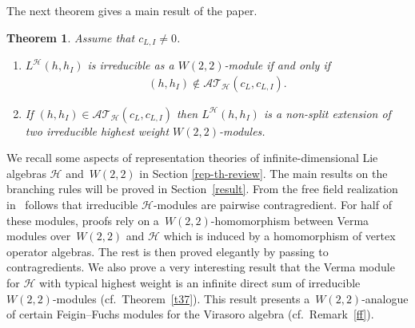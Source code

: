 \documentclass[pdftex]{sigma}
\numberwithin{equation}{section}
\newtheorem{Theorem}{Theorem}[section]
\newcommand{\HVir}{\mathcal H}
\begin{document}
The next theorem gives a main result of the paper.

\begin{Theorem}\label{main}
Assume that $c_{L,I}\neq0$.
\begin{enumerate}\itemsep=0pt
\item[$(1)$] $L^{\HVir}(h,h_I) $ is irreducible as a $W(2,2)$-module if and only if
\begin{gather*}
(h,h_I) \notin {\mathcal {AT} }_{\HVir} ( c_L, c_{L,I} ) .
\end{gather*}
\item[$(2)$] If $(h,h_I) \in {\mathcal {AT} }_{\HVir} ( c_L, c_{L,I} ) $ then $L^{\HVir}(h,h_I) $ is a non-split extension of two irreducible highest weight $W(2,2)$-modules.
\end{enumerate}
\end{Theorem}

We recall some aspects of representation theories of inf\/inite-dimensional Lie algebras $\HVir$ and~$W(2,2)$ in Section \ref{rep-th-review}. The main results on the branching rules will be proved in Section~\ref{result}. From the free f\/ield realization in~\cite{nas} follows that irreducible $\HVir$-modules are pairwise contragredient. For half of these modules, proofs rely on a~$W(2,2)$-homomorphism between Verma modules over~$W(2,2)$ and $\HVir$ which is induced by a homomorphism of vertex operator algebras. The rest is then proved elegantly by passing to contragredients. We also prove a very interesting result that the Verma module for $\HVir$ with typical highest weight is an inf\/inite direct sum of irreducible $W(2,2)$-modules (cf.\ Theorem~\ref{t37}). This result presents a~$W(2,2)$-analogue of certain Feigin--Fuchs modules for the Virasoro algebra (cf.\ Remark~\ref{ff}).
\end{document}
